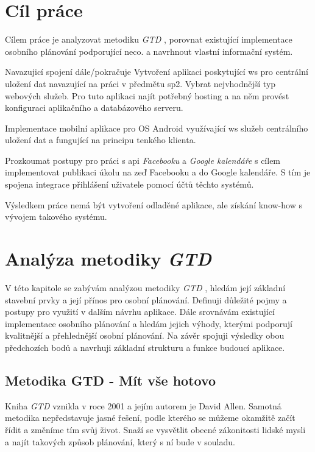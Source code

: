 \documentclass[thesis=B,czech]{FITthesis}[2012/06/26]
\newcommand{\GTD}{\textit{GTD }}
\begin{document}
\chapter{Cíl práce}

Cílem práce je analyzovat metodiku \GTD\cite{gtd}, porovnat existující implementace osobního plánování podporující neco. a navrhnout vlastní informační systém.

Navazujicí spojení  dále/pokračuje
Vytvoření aplikaci poskytující \acrshort{ws} pro centrální uložení dat navazující na práci v předmětu \acrshort{sp2}. Vybrat nejvhodnější typ webových služeb. Pro tuto aplikaci najít potřebný hosting a na něm provést konfiguraci aplikačního a databázového serveru.

Implementace mobilní aplikace pro OS Android využívající \acrshort{ws} služeb centrálního uložení dat a fungující na principu tenkého klienta.   

Prozkoumat postupy pro práci s \acrshort{api} \textit{Facebooku} a \textit{Google kalendáře} s cílem implementovat publikaci úkolu na zeď Facebooku a do Google kalendáře. S tím je spojena integrace přihlášení uživatele pomocí účtů těchto systémů.  

Výsledkem práce nemá být vytvoření odladěné aplikace, ale získání know-how s vývojem takového systému.
  
\chapter{Analýza metodiky \GTD}

V této kapitole se zabývám analýzou metodiky \GTD, hledám její základní stavební prvky a její přínos pro osobní plánování. Definuji důležité pojmy a postupy pro využití v dalším návrhu aplikace. 
Dále srovnávám existující implementace osobního plánování a hledám jejich výhody, kterými podporují kvalitnější a přehlednější osobní plánování.
Na závěr spojuji výsledky obou předchozích bodů a navrhuji základní strukturu a funkce budoucí aplikace.

\section{Metodika GTD - Mít vše hotovo}

Kniha \GTD\cite{gtd} vznikla v roce 2001 a jejím autorem je David Allen. Samotná metodika nepředstavuje jasné řešení, podle kterého se můžeme okamžitě začít řídit a změníme tím svůj život. Snaží se vysvětlit obecné zákonitosti lidské mysli a najít takových způsob plánování, který s ní bude v souladu.\\
\end{document}
